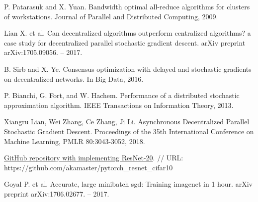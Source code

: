 \documentclass[a4paper,article,14pt]{extarticle}
\begin{document}
\begin{thebibliography}{1}
  P. Patarasuk and X. Yuan. \flqq Bandwidth optimal all-reduce algorithms for clusters of workstations\frqq. Journal of Parallel and Distributed Computing, 2009.

 Lian X. et al. \flqq Can decentralized algorithms outperform centralized algorithms? a case study for decentralized parallel stochastic gradient descent\frqq. arXiv preprint arXiv:1705.09056. – 2017.

 B. Sirb and X. Ye. \flqq Consensus optimization with delayed and stochastic gradients on decentralized networks\frqq. In Big Data, 2016.

 P. Bianchi, G. Fort, and W. Hachem. \flqq Performance of a distributed stochastic approximation algorithm\frqq. IEEE Transactions on Information Theory, 2013.

 Xiangru Lian, Wei Zhang, Ce Zhang, Ji Li. \flqq Asynchronous Decentralized Parallel Stochastic Gradient Descent\frqq. Proceedings of the 35th International Conference on Machine Learning, PMLR 80:3043-3052, 2018.

 \href{https://github.com/akamaster/pytorch_resnet_cifar10}{GitHub repository with implementing ResNet-20}. // URL: https://github.com/akamaster/pytorch\_resnet\_cifar10

 Goyal P. et al. \flqq Accurate, large minibatch sgd: Training imagenet in 1 hour\frqq. arXiv preprint arXiv:1706.02677. – 2017.

\end{thebibliography}
\end{document}
